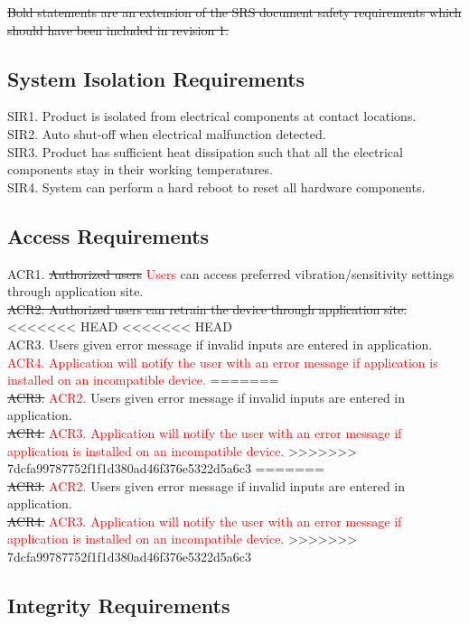 \documentclass[12pt, titlepage]{article}
\begin{document}
\sout{Bold statements are an extension of the SRS document safety requirements which should have been included in revision 1.}


\subsection{System Isolation Requirements}

SIR1. Product is isolated from electrical components at contact locations.
\\SIR2. Auto shut-off when electrical malfunction detected. 
\\SIR3. Product has sufficient heat dissipation such that all the electrical components stay in their working temperatures.
\\SIR4. System can perform a hard reboot to reset all hardware components.


\subsection{Access Requirements}

ACR1. \sout{Authorized users} \textcolor{red}{Users} can access preferred vibration/sensitivity settings through application site.
\sout{\\ACR2. Authorized users can retrain the device through application site.}
<<<<<<< HEAD
<<<<<<< HEAD
\\ACR3. Users given error message if invalid inputs are entered in application.
\\\textcolor{red}{ACR4. Application will notify the user with an error message if application is installed on an incompatible device.}
=======
\\\sout{ACR3.} \textcolor{red}{ACR2.} Users given error message if invalid inputs are entered in application.
\\\sout{ACR4.} \textcolor{red}{ACR3. Application will notify the user with an error message if application is installed on an incompatible device.}
>>>>>>> 7dcfa99787752f1f1d380ad46f376e5322d5a6c3
=======
\\\sout{ACR3.} \textcolor{red}{ACR2.} Users given error message if invalid inputs are entered in application.
\\\sout{ACR4.} \textcolor{red}{ACR3. Application will notify the user with an error message if application is installed on an incompatible device.}
>>>>>>> 7dcfa99787752f1f1d380ad46f376e5322d5a6c3

\subsection{Integrity Requirements}
\end{document}
